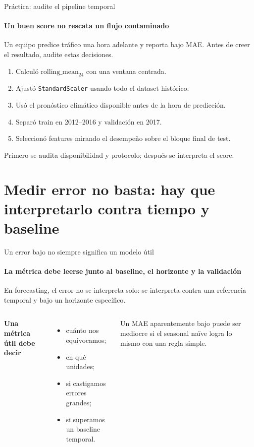 \documentclass[aspectratio=169,11pt]{beamer}  %
\newcommand{\Lg}{\fontsize{16}{20}\selectfont}
\newcommand{\bigstate}[1]{\begin{center}\Lg #1\end{center}}
\begin{document}
\begin{frame}{Práctica: audite el pipeline temporal}
\framesubtitle{Un buen score no rescata un flujo contaminado}
\begin{taskbox}
Un equipo predice tráfico una hora adelante y reporta bajo MAE. Antes de creer el resultado, audite estas decisiones.
\end{taskbox}
\begin{enumerate}
\item Calculó $\mathrm{rolling\_mean}_{24}$ con una ventana centrada.
\item Ajustó \texttt{StandardScaler} usando todo el dataset histórico.
\item Usó el pronóstico climático disponible antes de la hora de predicción.
\item Separó train en 2012--2016 y validación en 2017.
\item Seleccionó features mirando el desempeño sobre el bloque final de test.
\end{enumerate}
\begin{center}
Primero se audita disponibilidad y protocolo; después se interpreta el score.
\end{center}
\end{frame}

\section{Medir error no basta: hay que interpretarlo contra tiempo y baseline}

\begin{frame}{Un error bajo no siempre significa un modelo útil}
\framesubtitle{La métrica debe leerse junto al baseline, el horizonte y la validación}
\bigstate{En forecasting, el error no se interpreta solo: se interpreta contra una referencia temporal y bajo un horizonte específico.}
\begin{columns}[T]
\textbf{Una métrica útil debe decir}
\begin{itemize}
\item cuánto nos equivocamos;
\item en qué unidades;
\item si castigamos errores grandes;
\item si superamos un baseline temporal.
\end{itemize}
\vspace{0.4em}
\begin{rulebox}[Cuidado]
Un MAE aparentemente bajo puede ser mediocre si el seasonal naïve logra lo mismo con una regla simple.
\end{rulebox}
\end{columns}
\end{frame}
\end{document}
